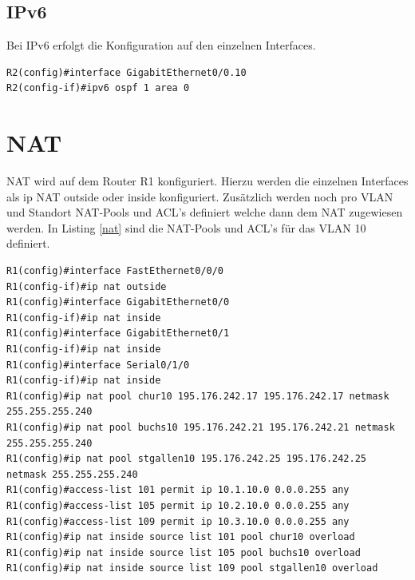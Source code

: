 \documentclass[11pt,a4paper]{scrreprt}
\begin{document}
\subsection{IPv6}
Bei IPv6 erfolgt die Konfiguration auf den einzelnen Interfaces.
\newline
\begin{lstlisting}[frame=single, captionpos=b,caption= OSPF IPv6]
R2(config)#interface GigabitEthernet0/0.10
R2(config-if)#ipv6 ospf 1 area 0
\end{lstlisting}
\section{NAT}
\acs{NAT} wird auf dem Router R1 konfiguriert. Hierzu werden die einzelnen Interfaces als ip \acs{NAT} outside oder inside konfiguriert. Zusätzlich werden noch pro \acs{VLAN} und Standort \acs{NAT}-Pools und \acs{ACL}'s definiert welche dann dem \acs{NAT} zugewiesen werden. In Listing \ref{nat} sind die \acs{NAT}-Pools und \acs{ACL}'s für das \acs{VLAN} 10 definiert.
\newline
\begin{lstlisting}[frame=single, breaklines=true, captionpos=b,caption= \acs{NAT},label=nat ]
R1(config)#interface FastEthernet0/0/0
R1(config-if)#ip nat outside
R1(config)#interface GigabitEthernet0/0
R1(config-if)#ip nat inside
R1(config)#interface GigabitEthernet0/1
R1(config-if)#ip nat inside
R1(config)#interface Serial0/1/0
R1(config-if)#ip nat inside
R1(config)#ip nat pool chur10 195.176.242.17 195.176.242.17 netmask 255.255.255.240
R1(config)#ip nat pool buchs10 195.176.242.21 195.176.242.21 netmask 255.255.255.240
R1(config)#ip nat pool stgallen10 195.176.242.25 195.176.242.25 netmask 255.255.255.240
R1(config)#access-list 101 permit ip 10.1.10.0 0.0.0.255 any
R1(config)#access-list 105 permit ip 10.2.10.0 0.0.0.255 any
R1(config)#access-list 109 permit ip 10.3.10.0 0.0.0.255 any
R1(config)#ip nat inside source list 101 pool chur10 overload
R1(config)#ip nat inside source list 105 pool buchs10 overload
R1(config)#ip nat inside source list 109 pool stgallen10 overload
\end{lstlisting}
\newpage
\end{document}
